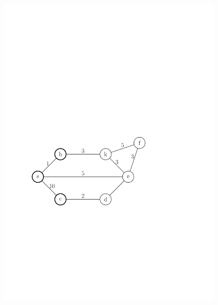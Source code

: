 \documentclass[10pt,xcolor=dvipsnames]{beamer}
\begin{document}
\begin{frame}
	\frametitle{}
	
	\begin{figure}[h]
	\centering
		\includegraphics[scale=0.55]{routing_table_graph_receive.pdf}
	\end{figure}


\end{frame}
\end{document}
